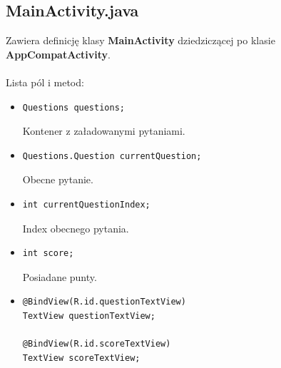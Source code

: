 \documentclass[12pt, a4paper]{article}
\begin{document}
\subsection{MainActivity.java}
Zawiera definicję klasy \textbf{MainActivity} dziedziczącej po klasie \textbf{AppCompatActivity}.\\\\
Lista pól i metod:
\begin{itemize}
\item\begin{lstlisting}
Questions questions;
\end{lstlisting}
Kontener z załadowanymi pytaniami.
\item\begin{lstlisting}
Questions.Question currentQuestion;
\end{lstlisting}
Obecne pytanie.
\item\begin{lstlisting}
int currentQuestionIndex;
\end{lstlisting}
Index obecnego pytania.
\item\begin{lstlisting}
int score;
\end{lstlisting}
Posiadane punty.
\item\begin{lstlisting}
@BindView(R.id.questionTextView)
TextView questionTextView;

@BindView(R.id.scoreTextView)
TextView scoreTextView;


\end{lstlisting}
\end{itemize}
\end{document}
